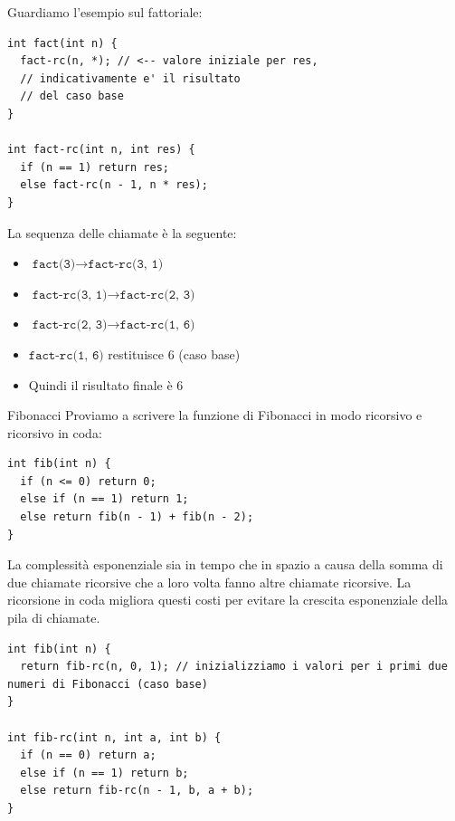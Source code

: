 \documentclass[a4paper]{article}
\begin{document}
\begin{Example}{}{}
Guardiamo l'esempio sul fattoriale:
\begin{lstlisting}
int fact(int n) {
  fact-rc(n, *); // <-- valore iniziale per res, 
  // indicativamente e' il risultato
  // del caso base 
}

int fact-rc(int n, int res) {
  if (n == 1) return res;
  else fact-rc(n - 1, n * res);
}
\end{lstlisting}
La sequenza delle chiamate è la seguente:
\begin{itemize}
  \item $\texttt{fact(3)} \to \texttt{fact-rc(3, 1)}$
  \item $\texttt{fact-rc(3, 1)} \to \texttt{fact-rc(2, 3)}$
  \item $\texttt{fact-rc(2, 3)} \to \texttt{fact-rc(1, 6)}$
  \item $\texttt{fact-rc(1, 6)}$ restituisce $6$ (caso base)
  \item Quindi il risultato finale è $6$
\end{itemize}
\end{Example}

\begin{Example}{Fibonacci}{}
  Proviamo a scrivere la funzione di Fibonacci in modo ricorsivo e ricorsivo in coda:
  \begin{lstlisting}
int fib(int n) {
  if (n <= 0) return 0;
  else if (n == 1) return 1;
  else return fib(n - 1) + fib(n - 2);
}
  \end{lstlisting}
\noindent
La complessità esponenziale sia in tempo che in spazio a causa della somma 
di due chiamate ricorsive che a loro volta fanno altre chiamate ricorsive.
La ricorsione in coda migliora questi costi per evitare 
la crescita esponenziale della pila di chiamate.
\begin{lstlisting}
int fib(int n) {
  return fib-rc(n, 0, 1); // inizializziamo i valori per i primi due numeri di Fibonacci (caso base)
}

int fib-rc(int n, int a, int b) {
  if (n == 0) return a;
  else if (n == 1) return b;
  else return fib-rc(n - 1, b, a + b);
}
\end{lstlisting}
\noindent
\end{Example}
\end{document}
